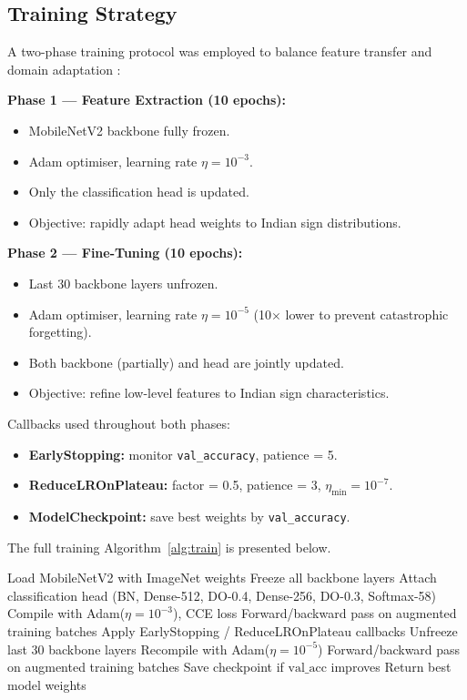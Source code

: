 \documentclass[journal,10pt,twocolumn]{IEEEtran}
\begin{document}
\subsection{Training Strategy}

A two-phase training protocol was employed to balance feature transfer and
domain adaptation \cite{pan2010survey}:

\textbf{Phase 1 — Feature Extraction (10 epochs):}
\begin{itemize}[nosep,leftmargin=*]
  \item MobileNetV2 backbone fully frozen.
  \item Adam optimiser, learning rate $\eta = 10^{-3}$.
  \item Only the classification head is updated.
  \item Objective: rapidly adapt head weights to Indian sign distributions.
\end{itemize}

\textbf{Phase 2 — Fine-Tuning (10 epochs):}
\begin{itemize}[nosep,leftmargin=*]
  \item Last 30 backbone layers unfrozen.
  \item Adam optimiser, learning rate $\eta = 10^{-5}$ (10$\times$ lower to
        prevent catastrophic forgetting).
  \item Both backbone (partially) and head are jointly updated.
  \item Objective: refine low-level features to Indian sign characteristics.
\end{itemize}

Callbacks used throughout both phases:
\begin{itemize}[nosep,leftmargin=*]
  \item \textbf{EarlyStopping:} monitor \texttt{val\_accuracy}, patience = 5.
  \item \textbf{ReduceLROnPlateau:} factor = 0.5, patience = 3,
        $\eta_{\min} = 10^{-7}$.
  \item \textbf{ModelCheckpoint:} save best weights by \texttt{val\_accuracy}.
\end{itemize}

The full training Algorithm~\ref{alg:train} is presented below.

\begin{algorithm}[H]
\caption{Two-Phase Transfer Learning for Indian TSR}
\label{alg:train}
\begin{algorithmic}[1]
\STATE Load MobileNetV2 with ImageNet weights
\STATE Freeze all backbone layers
\STATE Attach classification head (BN, Dense-512, DO-0.4, Dense-256, DO-0.3, Softmax-58)
\STATE Compile with Adam($\eta=10^{-3}$), CCE loss
  \STATE Forward/backward pass on augmented training batches
  \STATE Apply EarlyStopping / ReduceLROnPlateau callbacks
\ENDFOR
\STATE Unfreeze last 30 backbone layers
\STATE Recompile with Adam($\eta=10^{-5}$)
  \STATE Forward/backward pass on augmented training batches
  \STATE Save checkpoint if $\text{val\_acc}$ improves
\ENDFOR
\STATE Return best model weights
\end{algorithmic}
\end{algorithm}
\end{document}
